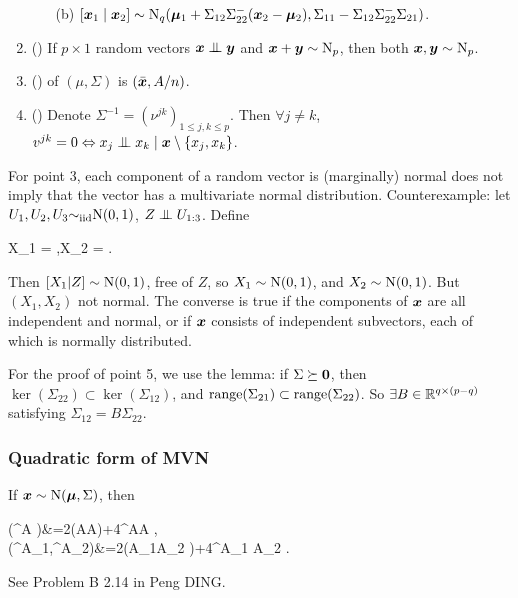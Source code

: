 \documentclass[10pt,a4paper]{book}
\begin{document}
\begin{thmbox}
\begin{theorem}
\begin{enumerate}
\begin{itemize}
				\item[(b)] $[{\boldsymbol x}_1\mid{\boldsymbol x}_2]\sim\mathrm{N}_q({\boldsymbol\mu}_1+{\Sigma}_{12}{\Sigma}_{22}^-({\boldsymbol x}_2-{\boldsymbol\mu}_2),\Sigma_{11}-\Sigma_{12}\Sigma_{22}^{-}\Sigma_{21})$. 
			\end{itemize}  
			\item () If $p\times 1$ random vectors $\x\indep \y$ and ${\boldsymbol x}+{\boldsymbol y}\sim\mathrm{N}_p$, then both ${\boldsymbol x},{\boldsymbol y}\sim\mathrm{N}_p$. 
			\item () of $(\mu,\Sigma)$ is $(\bar{{\boldsymbol x}},A/n)$.    
			\item () Denote $\Sigma^{-1}=(\nu^{jk})_{1\leq j,k\leq p}$. Then $\forall j\neq k$, $v^{jk}=0\Leftrightarrow  x_j\indep x_k \mid \x\setminus\{x_j,x_k\}$.    
		\end{enumerate} 
	\end{theorem}
\end{thmbox}
For point 3, each component of a random vector is (marginally) normal does not imply that the vector has a multivariate normal distribution. Counterexample: let $U_1,U_2,U_3{\sim}_{\mathrm{iid}}\mathrm{N}(0,1)$, $Z\indep U_{1:3}$. Define 
\begin{sequation*}
	X_1 = ,\quad X_2 = .
\end{sequation*}   
Then $[X_1|Z]\sim\mathrm{N}(0,1)$, free of $Z$, so $X_1\sim\mathrm{N}(0,1)$, and $X_2\sim\mathrm{N}(0,1)$. But $(X_1,X_2)$ not normal.
The converse is true if the components of ${\boldsymbol x}$ are all independent and normal, or if ${\boldsymbol x}$ consists of independent subvectors, each of which is normally distributed.

For the proof of point 5, we use the lemma: if $\Sigma\succeq {\boldsymbol 0}$, 
then $\ker(\Sigma_{22})\subset \ker(\Sigma_{12})$, and $\mathrm{range}(\Sigma_{21})\subset\mathrm{range}(\Sigma_{22})$. 
So $\exists B\in\mathbb R^{q\times(p-q)}$ satisfying $\Sigma_{12}=B\Sigma_{22}$.  

\subsubsection{Quadratic form of MVN}\label{sec:quad_MVN}
\begin{thmbox}
	\begin{proposition}[Variance]\label{prop:var_MVN_quad}
		If ${\boldsymbol x}\sim\mathrm{N}({\boldsymbol\mu},\Sigma)$, then 
		\begin{sequation*}
			\begin{aligned}
			\Var(\x^\TT A \x)&=2\tr(A\Sigma A\Sigma)+4\bam^\TT A\Sigma A \bam, \\
			\Cov(\x^\TT A_1\x,\x^\TT A_2\x)&=2\tr(A_1\Sigma A_2 \Sigma)+4\bam^\TT A_1 \Sigma A_2 \bam.
			\end{aligned}
		\end{sequation*} 
	\end{proposition}
\end{thmbox}
See Problem B 2.14 in Peng DING. 
\end{document}
